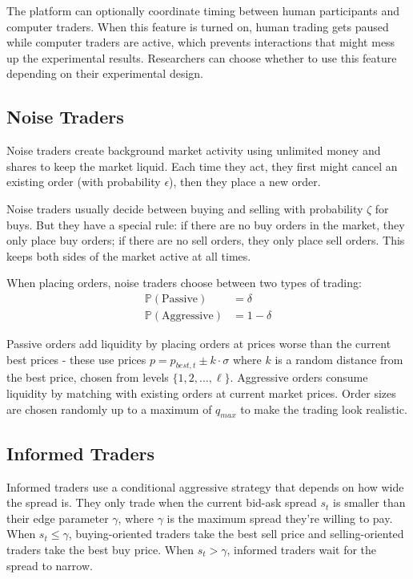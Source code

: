 The platform can optionally coordinate timing between human participants and computer traders. When this feature is turned on, human trading gets paused while computer traders are active, which prevents interactions that might mess up the experimental results. Researchers can choose whether to use this feature depending on their experimental design.

\subsection{Noise Traders}

Noise traders create background market activity using unlimited money and shares to keep the market liquid. Each time they act, they first might cancel an existing order (with probability $\epsilon$), then they place a new order.

Noise traders usually decide between buying and selling with probability $\zeta$ for buys. But they have a special rule: if there are no buy orders in the market, they only place buy orders; if there are no sell orders, they only place sell orders. This keeps both sides of the market active at all times.

When placing orders, noise traders choose between two types of trading:
\begin{align}
\mathbb{P}(\text{Passive}) &= \delta \\
\mathbb{P}(\text{Aggressive}) &= 1 - \delta
\end{align}

Passive orders add liquidity by placing orders at prices worse than the current best prices - these use prices $p = p_{best,t} \pm k \cdot \sigma$ where $k$ is a random distance from the best price, chosen from levels $\{1, 2, \ldots, \ell\}$. Aggressive orders consume liquidity by matching with existing orders at current market prices. Order sizes are chosen randomly up to a maximum of $q_{max}$ to make the trading look realistic.

\subsection{Informed Traders}

Informed traders use a conditional aggressive strategy that depends on how wide the spread is. They only trade when the current bid-ask spread $s_t$ is smaller than their edge parameter $\gamma$, where $\gamma$ is the maximum spread they're willing to pay. When $s_t \leq \gamma$, buying-oriented traders take the best sell price and selling-oriented traders take the best buy price. When $s_t > \gamma$, informed traders wait for the spread to narrow.

